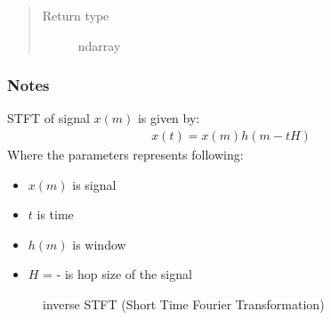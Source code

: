 \documentclass[letterpaper,10pt,english]{sphinxmanual}
\begin{document}
\begin{fulllineitems}
\begin{fulllineitems}
\begin{quote}
\begin{description}
\item[{Return type}] \leavevmode
ndarray

\end{description}\end{quote}
\subsubsection*{Notes}

STFT of signal \(x(m)\) is given by:
\begin{equation*}
\begin{split}x(t) = x(m)h(m - tH)\end{split}
\end{equation*}
Where the parameters represents following:
\begin{itemize}
\item {} 
\(x(m)\) is signal

\item {} 
\(t\) is time

\item {} 
\(h(m)\) is window

\item {} 
\(H\) =  -  is hop size of the signal

\end{itemize}



\begin{description}
\item[{{\hyperref[\detokenize{docs/source/preprocess:preprocess.preprocess_tools.STFT.istft}]{}}}] \leavevmode
inverse STFT (Short Time Fourier Transformation)

\end{description}



\end{fulllineitems}


\end{fulllineitems}

\end{document}
